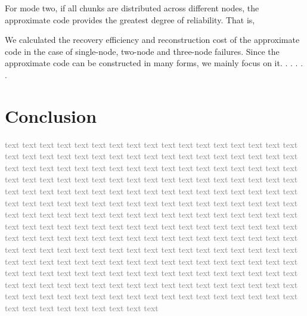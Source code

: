 \documentclass[sigconf]{acmart}
\begin{document}
For mode two, if all chunks are distributed across different nodes, the approximate code provides the greatest degree of reliability. That is,



We calculated the recovery efficiency and reconstruction cost of the approximate code in the case of single-node, two-node and three-node failures. Since the approximate code can be constructed in many forms, we mainly focus on it. . . . . .




\section{Conclusion}\label{Conclusion}

\textcolor{gray}{
    text text text text text text text text text text text text text text text text text text text text text text text text text text text text text text text text text text text text text text text text text text text text text text text text text text text text text text text text text text text text text text text text text text text text text text text text text text text text text text text text text text text text text text text text text text text text text text text text text text text text text text text text text text text text text text text text text text text text text text text text text text text text text text text text text text text text text text text text text text text text text text text text text text text text text text text text text text text text text text text text text text text text text text text text text text text text text text text text text text text text text text
    text text text text text text text text text text text text text text text text text text text text text text text text text text text text text text text text text text text text text text text text text text text text text text text text text text text text text text text text text text text text text text text text text
}


\begin{acks}

\end{acks}





\end{document}
